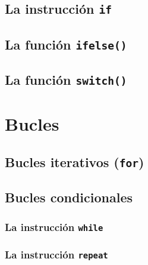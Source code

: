\documentclass[
]{book}
\theoremstyle{definition}
\theoremstyle{definition}
\theoremstyle{definition}
\theoremstyle{definition}
\theoremstyle{remark}
\begin{document}
\hypertarget{la-instrucciuxf3n-if}{%
\subsection{\texorpdfstring{La instrucción \texttt{if}}{La instrucción if}}\label{la-instrucciuxf3n-if}}

\hypertarget{la-funciuxf3n-ifelse}{%
\subsection{\texorpdfstring{La función \texttt{ifelse()}}{La función ifelse()}}\label{la-funciuxf3n-ifelse}}

\hypertarget{la-funciuxf3n-switch}{%
\subsection{\texorpdfstring{La función \texttt{switch()}}{La función switch()}}\label{la-funciuxf3n-switch}}

\hypertarget{bucles}{%
\section{Bucles}\label{bucles}}

\hypertarget{bucles-iterativos-for}{%
\subsection{\texorpdfstring{Bucles iterativos (\texttt{for})}{Bucles iterativos (for)}}\label{bucles-iterativos-for}}

\hypertarget{bucles-condicionales}{%
\subsection{Bucles condicionales}\label{bucles-condicionales}}

\hypertarget{la-instrucciuxf3n-while}{%
\subsubsection{\texorpdfstring{La instrucción \texttt{while}}{La instrucción while}}\label{la-instrucciuxf3n-while}}

\hypertarget{la-instrucciuxf3n-repeat}{%
\subsubsection{\texorpdfstring{La instrucción \texttt{repeat}}{La instrucción repeat}}\label{la-instrucciuxf3n-repeat}}
\end{document}

